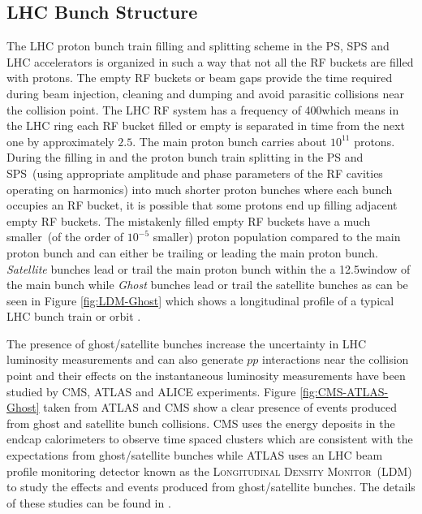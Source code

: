 \subsection{LHC Bunch Structure}\label{Ghost}
The LHC proton bunch train filling and splitting scheme in the PS, SPS and LHC accelerators is organized in such a way that not all the RF buckets are filled with protons. The empty RF buckets or beam gaps provide the time required during beam injection, cleaning and dumping and avoid parasitic collisions near the collision point. The LHC RF system  has a frequency of 400\MHz which means in the LHC ring each RF bucket filled or empty is separated in time from the next one by approximately $2.5$\ns. The main proton bunch carries about $10^{11}$ protons. During the filling in \linac and the proton bunch train splitting in the PS and SPS~(using appropriate amplitude and phase parameters of the RF cavities operating on harmonics) into much shorter proton bunches where each bunch occupies an RF bucket, it is possible that some protons end up filling adjacent empty RF buckets. The mistakenly filled empty RF buckets have a much smaller~(of the order of $10^{-5}$ smaller) proton population compared to the main proton bunch and can either be trailing or leading the main proton bunch. \textit{Satellite} bunches lead or trail the main proton bunch within the a 12.5\ns window of the main bunch while \textit{Ghost} bunches lead or trail the satellite bunches as can be seen in Figure \ref{fig:LDM-Ghost} which shows a longitudinal profile of a typical LHC bunch train or orbit \cite{LDM}.
\par 
The presence of ghost/satellite bunches increase the uncertainty in LHC luminosity measurements and can also generate $pp$ interactions near the collision point and their effects on the instantaneous luminosity measurements have been studied  by CMS, ATLAS and ALICE experiments. Figure \ref{fig:CMS-ATLAS-Ghost} taken from ATLAS and CMS show a clear presence of events produced from ghost and satellite bunch collisions. CMS uses the energy deposits in the endcap calorimeters to observe time spaced clusters which are consistent with the expectations from ghost/satellite bunches while ATLAS uses an LHC beam profile monitoring detector known as the \textsc{Longitudinal Density Monitor}~(LDM) to study the effects and events produced from ghost/satellite bunches. The details of these studies can be found in \cite{ATLAS-GHOST, CMS-GHOST}.

